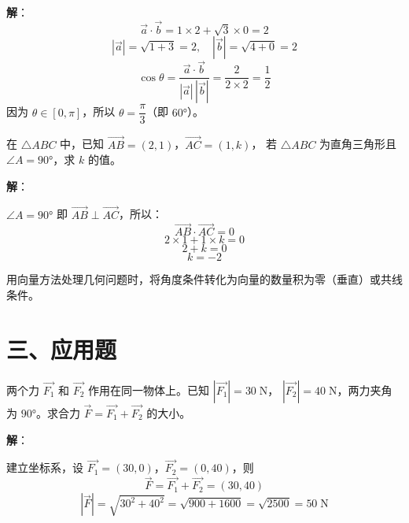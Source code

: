 \documentclass[12pt, a4paper]{ctexart}
\begin{document}
\textbf{解}：
\[
\vec{a}\cdot\vec{b} = 1\times 2 + \sqrt{3}\times 0 = 2
\]
\[
|\vec{a}| = \sqrt{1+3} = 2, \quad |\vec{b}| = \sqrt{4+0} = 2
\]
\[
\cos\theta = \frac{\vec{a}\cdot\vec{b}}{|\vec{a}|\,|\vec{b}|} = \frac{2}{2\times 2} = \frac{1}{2}
\]
因为 $\theta \in [0,\pi]$，所以 $\theta = \dfrac{\pi}{3}$（即 $60°$）。

\begin{examplebox}[【例题10】向量法判断三角形的形状]
在 $\triangle ABC$ 中，已知 $\overrightarrow{AB}=(2,1)$，$\overrightarrow{AC}=(1,k)$，
若 $\triangle ABC$ 为直角三角形且 $\angle A = 90°$，求 $k$ 的值。
\end{examplebox}

\textbf{解}：

$\angle A = 90°$ 即 $\overrightarrow{AB} \perp \overrightarrow{AC}$，所以：
\[
\overrightarrow{AB}\cdot\overrightarrow{AC} = 0
\]
\[
2\times 1 + 1\times k = 0
\]
\[
2 + k = 0
\]
\[
k = -2
\]

\begin{tipbox}[方法总结]
用向量方法处理几何问题时，将角度条件转化为向量的数量积为零（垂直）或共线条件。
\end{tipbox}

\vspace{10pt}

\section*{\textcolor{apppurple}{三、应用题}}

\begin{appbox}[【应用1】力的合成]
两个力 $\vec{F_1}$ 和 $\vec{F_2}$ 作用在同一物体上。已知 $|\vec{F_1}|=30\;\text{N}$，
$|\vec{F_2}|=40\;\text{N}$，两力夹角为 $90°$。求合力 $\vec{F}=\vec{F_1}+\vec{F_2}$ 的大小。
\end{appbox}

\textbf{解}：

建立坐标系，设 $\vec{F_1}=(30,0)$，$\vec{F_2}=(0,40)$，则
\[
\vec{F} = \vec{F_1}+\vec{F_2} = (30,40)
\]
\[
|\vec{F}| = \sqrt{30^2+40^2} = \sqrt{900+1600} = \sqrt{2500} = 50 \;\text{N}
\]

\begin{center}
\end{center}
\end{document}
